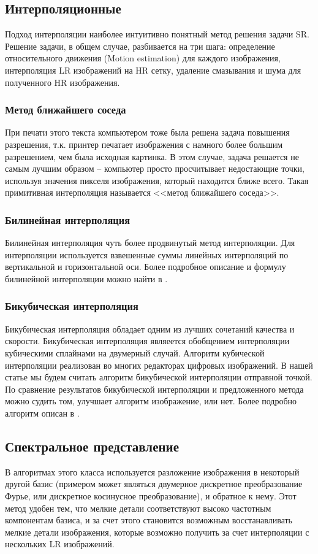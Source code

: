 \subsection{Интерполяционные} Подход интерполяции наиболее интуитивно понятный метод решения задачи SR. Решение задачи,
в общем случае, разбивается на три шага: определение относительного движения (Motion estimation) для каждого
изображения, интерполяция LR изображений на HR сетку, удаление смазывания и шума для полученного HR изображения.

\subsubsection{Метод ближайшего соседа}
При печати этого текста компьютером тоже была решена задача повышения разрешения, т.к. принтер печатает изображения с
намного более большим разрешением, чем была исходная картинка. В этом случае, задача решается не самым лучшим образом --
компьютер просто просчитывает недостающие точки, используя значения пикселя изображения, который находится ближе всего.
Такая примитивная интерполяция называется <<метод ближайшего соседа>>.

\subsubsection{Билинейная интерполяция}
Билинейная интерполяция чуть более продвинутый метод интерполяции. Для интерполяции используется взвешенные суммы
линейных интерполяций по вертикальной и горизонтальной оси. Более подробное описание и формулу билинейной интерполяции
можно найти в \cite[стр. 64]{gonzalez2002woods}.

\subsubsection{Бикубическая интерполяция}
Бикубическая интерполяция обладает одним из лучших сочетаний качества и скорости.  Бикубическая
интерполяция являеется обобщением интерполяции кубическими сплайнами на двумерный случай. Алгоритм кубической
интерполяции реализован во многих редакторах цифровых изображений. В нашей статье мы будем считать алгоритм бикубической
интерполяции отправной точкой. По сравнение результатов бикубической интерполяции и предложенного метода можно судить
том, улучшает алгоритм изображение, или нет. Более подробно алгоритм описан в  \cite{keys1981cubic}.

\subsection{Спектральное представление}
В алгоритмах этого класса используется разложение изображения в некоторый другой
базис (примером может являться двумерное дискретное преобразование Фурье, или дискретное косинусное преобразование), и
обратное к нему.  Этот метод удобен тем, что мелкие детали соответствуют высоко частотным компонентам базиса, и за счет
этого становится возможным восстанавливать мелкие детали изображения, которые возможно получить за счет интерполяции с
нескольких LR изображений. \cite{danielyan2012bm3d, Zemlyansky2012}

